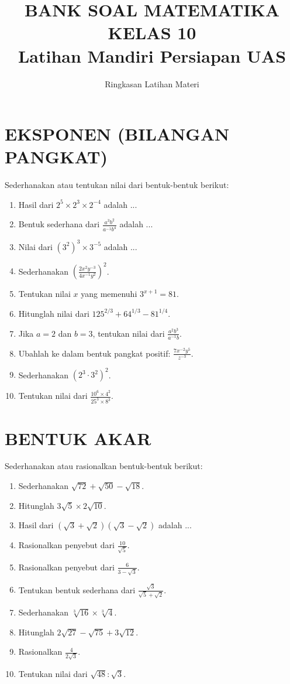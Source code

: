 \documentclass[12pt, a4paper]{article}
\title{BANK SOAL MATEMATIKA KELAS 10\\ \large Latihan Mandiri Persiapan UAS}
\author{Ringkasan Latihan Materi}
\date{}
\begin{document}
\maketitle

\section{EKSPONEN (BILANGAN PANGKAT)}
Sederhanakan atau tentukan nilai dari bentuk-bentuk berikut:
\begin{enumerate}
    \item Hasil dari $2^5 \times 2^3 \times 2^{-4}$ adalah ...
    \item Bentuk sederhana dari $\frac{a^3 b^2}{a^{-1} b^4}$ adalah ...
    \item Nilai dari $(3^2)^3 \times 3^{-5}$ adalah ...
    \item Sederhanakan $\left( \frac{2x^2 y^{-3}}{4x^{-1} y^2} \right)^2$.
    \item Tentukan nilai $x$ yang memenuhi $3^{x+1} = 81$.
    \item Hitunglah nilai dari $125^{2/3} + 64^{1/3} - 81^{1/4}$.
    \item Jika $a=2$ dan $b=3$, tentukan nilai dari $\frac{a^2 b^3}{a^{-1} b}$.
    \item Ubahlah ke dalam bentuk pangkat positif: $\frac{7x^{-2} y^5}{z^{-3}}$.
    \item Sederhanakan $(2^3 \cdot 3^2)^2$.
    \item Tentukan nilai dari $\frac{10^6 \times 4^2}{25^3 \times 8^3}$.
\end{enumerate}

\section{BENTUK AKAR}
Sederhanakan atau rasionalkan bentuk-bentuk berikut:
\begin{enumerate}
    \item Sederhanakan $\sqrt{72} + \sqrt{50} - \sqrt{18}$.
    \item Hitunglah $3\sqrt{5} \times 2\sqrt{10}$.
    \item Hasil dari $(\sqrt{3} + \sqrt{2})(\sqrt{3} - \sqrt{2})$ adalah ...
    \item Rasionalkan penyebut dari $\frac{10}{\sqrt{5}}$.
    \item Rasionalkan penyebut dari $\frac{6}{3 - \sqrt{3}}$.
    \item Tentukan bentuk sederhana dari $\frac{\sqrt{3}}{\sqrt{5} + \sqrt{2}}$.
    \item Sederhanakan $\sqrt[3]{16} \times \sqrt[3]{4}$.
    \item Hitunglah $2\sqrt{27} - \sqrt{75} + 3\sqrt{12}$.
    \item Rasionalkan $\frac{4}{2\sqrt{3}}$.
    \item Tentukan nilai dari $\sqrt{48} : \sqrt{3}$.
\end{enumerate}
\end{document}
